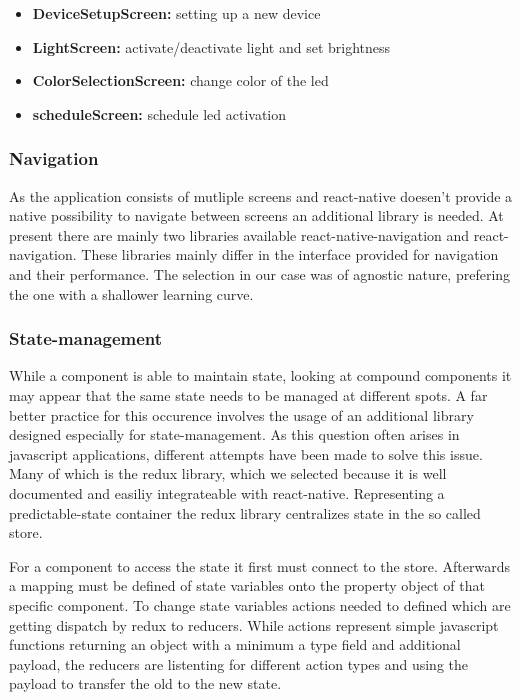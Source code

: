 \documentclass[conference]{IEEEtran}
\begin{document}
\vspace{5pt}
\begin{itemize}
    \item \textbf{DeviceSetupScreen:} setting up a new device
    \item \textbf{LightScreen:} activate/deactivate light and set brightness
    \item \textbf{ColorSelectionScreen:} change color of the led
    \item \textbf{scheduleScreen:} schedule led activation 
\end{itemize}
\vspace{12pt}


\subsubsection{Navigation}
As the application consists of mutliple screens and react-native doesen't provide a native possibility to navigate between screens an 
additional library is needed. At present there are mainly two libraries available react-native-navigation and react-navigation. These
libraries mainly differ in the interface provided for navigation and their performance. The selection in our case was of agnostic nature,
prefering the one with a shallower learning curve. 

\subsubsection{State-management}
While a component is able to maintain state, looking at compound components it may appear that the same state needs to be managed at
different spots. A far better practice for this occurence involves the usage of an additional library designed especially for 
state-management. As this question often arises in javascript applications, different attempts have been made to solve this issue.
Many of which is the redux library, which we selected because it is well documented and easiliy integrateable with react-native.
Representing a predictable-state container the redux library centralizes state in the so called store. 

For a component to access the state it first must connect to the store. Afterwards a mapping must be defined of state variables onto the
property object of that specific component. To change state variables actions needed to defined which are getting dispatch by redux to
reducers. While actions represent simple javascript functions returning an object with a minimum a type field and additional payload,
the reducers are listenting for different action types and using the payload to transfer the old to the new state. 
\end{document}
